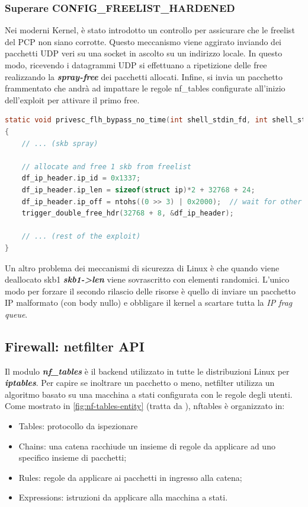\documentclass{article}
\begin{document}
\subsubsection{Superare CONFIG\_FREELIST\_HARDENED} Nei moderni Kernel, è stato introdotto 
un controllo per assicurare che le freelist del PCP non siano corrotte. Questo meccanismo 
viene aggirato inviando dei pacchetti UDP veri su una socket in ascolto su un indirizzo locale. 
In questo modo, ricevendo i datagrammi UDP si effettuano a ripetizione delle free realizzando 
la \textbf{\textit{spray-free}} dei pacchetti allocati. Infine, si invia un pacchetto frammentato 
che andrà ad impattare le regole nf\_tables configurate all'inizio dell'exploit per attivare 
il primo free.

\begin{lstlisting}[language=C,style=CStyle,caption="Trigger del primo free con un pacchetto frammentato (0x2000)"]
static void privesc_flh_bypass_no_time(int shell_stdin_fd, int shell_stdout_fd)
{
    // ... (skb spray)

    // allocate and free 1 skb from freelist
	df_ip_header.ip_id = 0x1337;
	df_ip_header.ip_len = sizeof(struct ip)*2 + 32768 + 24;
	df_ip_header.ip_off = ntohs((0 >> 3) | 0x2000);  // wait for other fragments. 8 >> 3 to make it wait or so?
	trigger_double_free_hdr(32768 + 8, &df_ip_header);

    // ... (rest of the exploit)
} 
\end{lstlisting}
Un altro problema dei meccanismi di sicurezza di Linux è che quando viene deallocato skb1 
\textbf{\textit{skb1->len}} viene sovrascritto con elementi randomici. L'unico modo per forzare 
il secondo rilascio delle risorse è quello di inviare un pacchetto IP malformato (con body nullo) 
e obbligare il kernel a scartare tutta la \textit{IP frag queue}.

\subsection{Firewall: netfilter API}
Il modulo \textbf{\textit{nf\_tables}} è il backend utilizzato in tutte le distribuzioni 
Linux per \textbf{\textit{iptables}}. Per capire se inoltrare un pacchetto o meno,
netfilter utilizza un algoritmo basato su una macchina a stati configurata con le regole 
degli utenti. Come mostrato in \cref{fig:nf-tables-entity} (tratta da \cite{NetfilterTablesVulnerability}), nftables è organizzato in:
\begin{itemize}
  \item Tables: protocollo da ispezionare
  \item Chains: una catena racchiude un insieme di regole da applicare ad uno specifico insieme di 
    pacchetti;
  \item Rules: regole da applicare ai pacchetti in ingresso alla catena;
  \item Expressions: istruzioni da applicare alla macchina a stati.
\end{itemize}
\end{document}
